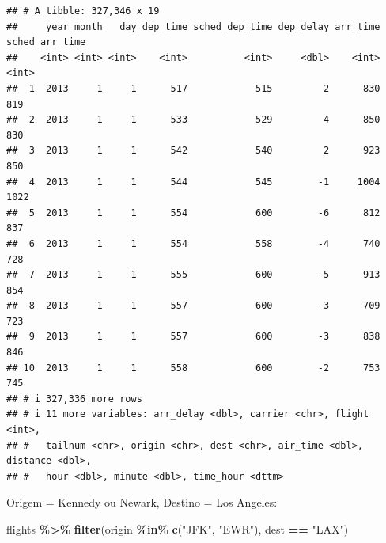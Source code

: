 \documentclass[
]{book}
\newenvironment{Shaded}{\begin{snugshade}}{\end{snugshade}}
\newcommand{\FunctionTok}[1]{\textcolor[rgb]{0.13,0.29,0.53}{\textbf{#1}}}
\newcommand{\NormalTok}[1]{#1}
\newcommand{\SpecialCharTok}[1]{\textcolor[rgb]{0.81,0.36,0.00}{\textbf{#1}}}
\newcommand{\StringTok}[1]{\textcolor[rgb]{0.31,0.60,0.02}{#1}}
\begin{document}
\begin{verbatim}
## # A tibble: 327,346 x 19
##     year month   day dep_time sched_dep_time dep_delay arr_time sched_arr_time
##    <int> <int> <int>    <int>          <int>     <dbl>    <int>          <int>
##  1  2013     1     1      517            515         2      830            819
##  2  2013     1     1      533            529         4      850            830
##  3  2013     1     1      542            540         2      923            850
##  4  2013     1     1      544            545        -1     1004           1022
##  5  2013     1     1      554            600        -6      812            837
##  6  2013     1     1      554            558        -4      740            728
##  7  2013     1     1      555            600        -5      913            854
##  8  2013     1     1      557            600        -3      709            723
##  9  2013     1     1      557            600        -3      838            846
## 10  2013     1     1      558            600        -2      753            745
## # i 327,336 more rows
## # i 11 more variables: arr_delay <dbl>, carrier <chr>, flight <int>,
## #   tailnum <chr>, origin <chr>, dest <chr>, air_time <dbl>, distance <dbl>,
## #   hour <dbl>, minute <dbl>, time_hour <dttm>
\end{verbatim}

Origem = Kennedy ou Newark, Destino = Los Angeles:

\begin{Shaded}
\begin{Highlighting}[]
\NormalTok{flights }\SpecialCharTok{\%\textgreater{}\%} \FunctionTok{filter}\NormalTok{(origin }\SpecialCharTok{\%in\%} \FunctionTok{c}\NormalTok{(}\StringTok{"JFK"}\NormalTok{, }\StringTok{"EWR"}\NormalTok{), dest }\SpecialCharTok{==} \StringTok{"LAX"}\NormalTok{)}
\end{Highlighting}
\end{Shaded}
\end{document}
